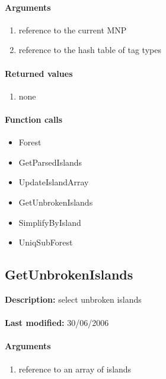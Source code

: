 \paragraph{Arguments}
\begin{enumerate}
\item reference to the current MNP
\item reference to the hash table of tag types
\end{enumerate}

\paragraph{Returned values}
\begin{enumerate}
\item none
\end{enumerate}

\paragraph{Function calls}
\begin{itemize}
\item Forest
\item GetParsedIslands
\item UpdateIslandArray
\item GetUnbrokenIslands
\item SimplifyByIsland
\item UniqSubForest
\end{itemize}

\subsection{GetUnbrokenIslands}
\textbf{Description:} select unbroken islands\\
\\\textbf{Last modified:} 30/06/2006

\paragraph{Arguments}
\begin{enumerate}
\item reference to an array of islands
\end{enumerate}

